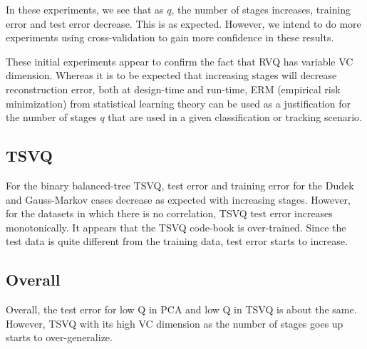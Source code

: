In these experiments, we see that as $q$, the number of stages increases, training error and test error decrease.  This is as expected.  However, we intend to do more experiments using cross-validation to gain more confidence in these results.

These initial experiments appear to confirm the fact that RVQ has variable VC dimension.  Whereas it is to be expected that increasing stages will decrease reconstruction error, both at design-time and run-time, ERM (empirical risk minimization) from statistical learning theory can be used as a justification for the number of stages $q$ that are used in a given classification or tracking scenario. 

\subsection{TSVQ}
For the binary balanced-tree TSVQ, test error and training error for the Dudek and Gauss-Markov cases decrease as expected with increasing stages.  However, for the datasets in which there is no correlation, TSVQ test error increases monotonically.  It appears that the TSVQ code-book is over-trained.  Since the test data is quite different from the training data, test error starts to increase.  

\subsection{Overall}
Overall, the test error for low Q in PCA and low Q in TSVQ is about the same.  However, TSVQ with its high VC dimension as the number of stages goes up starts to over-generalize.

\normalsize


